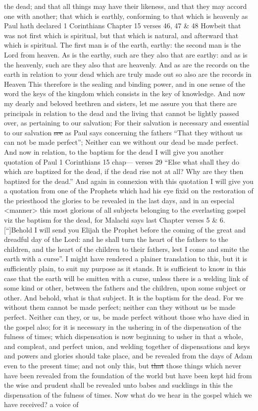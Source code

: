the dead; and that all things may have their likeness, and that they may accord one with another; that which is earthly, conforming to that which is heavenly as Paul hath declared 1 Corinthians Chapter 15 verses 46, 47 \& 48 Howbeit that was not first which is spiritual, but that which is natural, and afterward that which is spiritual. The first man is of the earth, earthy: the second man is the Lord from heaven. As is the earthy, such are they also that are earthy: and as is the heavenly, such are they also that are heavenly. And as are the records on the earth in relation to your dead which are truly made out so also are the records in Heaven This therefore is the sealing and binding power, and in one sense of the word the keys of the kingdom which consists in the key of knowledge. And now my dearly and beloved brethren and sisters, let me assure you that there are principals in relation to the dead and the living that cannot be lightly passed over, as pertaining to our salvation; For their salvation is necessary and essential to our salvation \sout{see} as Paul says concerning the fathers ``That they without us can not be made perfect''; Neither can we without our dead be made perfect. And now in relation, to the baptism for the dead I will give you another quotation of Paul 1 Corinthians 15 chap--- verses 29 ``Else what shall they do which are baptized for the dead, if the dead rise not at all? Why are they then baptized for the dead.'' And again in connexion with this quotation I will give you a quotation from one of the Prophets which had his eye fixid on the restoration of the priesthood the glories to be revealed in the last days, and in an especial <manner> this most glorious of all subjects belonging to the everlasting gospel viz the baptism for the dead, for Malachi says last Chapter verses 5 \& 6. [``]Behold I will send you Elijah the Prophet before the coming of the great and dreadful day of the Lord: and he shall turn the heart of the fathers to the children, and the heart of the children to their fathers, lest I come and smite the earth with a curse''. I might have rendered a plainer translation to this, but it is sufficiently plain, to suit my purpose as it stands. It is sufficient to know in this case that the earth will be smitten with a curse, unless there is a welding link of some kind or other, between the fathers and the children, upon some subject or other. And behold, what is that subject. It is the baptism for the dead. For we without them cannot be made perfect; neither can they without us be made perfect. Neither can they, or us, be made perfect without those who have died in the gospel also; for it is necessary in the ushering in of the dispensation of the fulness of times; which dispensation is now beginning to usher in that a whole, and compleat, and perfect union, and welding together of dispensations and keys and powers and glories should take place, and be revealed from the days of Adam even to the present time; and not only this, but \sout{that} those things which never have been revealed from the foundation of the world but have been kept hid from the wise and prudent shall be revealed unto babes and sucklings in this the dispensation of the fulness of times. Now what do we hear in the gospel which we have received? a voice of 
